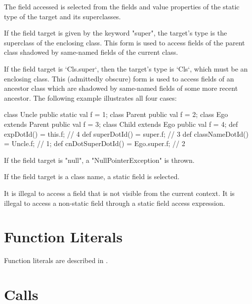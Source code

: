 The field accessed is selected from the fields and value properties
of the static type of the target and its superclasses.

If the field target is given by the keyword \xcd"super", the target's type is
the superclass of the enclosing class.  This form is used to access fields of
the parent class shadowed by same-named fields of the current class.

If the field target is \xcd`Cls.super`, then the target's type is \xcd`Cls`,
which must be an  enclosing class.  This (admittedly
obscure) form is used to access fields of an ancestor class which are shadowed
by same-named fields of some more recent ancestor.  The following example
illustrates all four cases:

\begin{xten}
class Uncle {
  public static val f = 1;
}
class Parent {
  public val f = 2;
}
class Ego extends Parent {
  public val f = 3;
  class Child extends Ego {
     public val f = 4;
     def expDotId() = this.f; // 4
     def superDotId() = super.f; // 3
     def classNameDotId() = Uncle.f; // 1;
     def cnDotSuperDotId() = Ego.super.f; // 2
  }
}
\end{xten}
%


If the field target is \xcd"null", a \xcd"NullPointerException"
is thrown.

If the field target is a class name, a static field is selected.

It is illegal to access  a field that is not visible from
the current context.
It is illegal to access a non-static field
through a static field access expression.

\section{Function Literals}
Function literals are described in .

\section{Calls}
\label{Call}
\label{MethodInvocation}
\label{MethodInvocationSubstitution}


